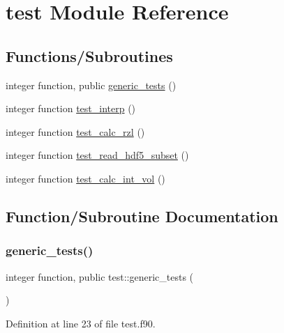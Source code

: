 \hypertarget{namespacetest}{}\section{test Module Reference}
\label{namespacetest}
\subsection*{Functions/\+Subroutines}
\begin{DoxyCompactItemize}
\item 
integer function, public \hyperlink{namespacetest_aca21ee464c0b1f4b617177afdde110ec}{generic\+\_\+tests} ()
\item 
integer function \hyperlink{namespacetest_af72aaa5773b5bef2ac8d25fd05378439}{test\+\_\+interp} ()
\item 
integer function \hyperlink{namespacetest_a4a25e64af6b986091f9e49ba447fc5c4}{test\+\_\+calc\+\_\+rzl} ()
\item 
integer function \hyperlink{namespacetest_ac574f08ba400cd61070a6a6f13f6f7ee}{test\+\_\+read\+\_\+hdf5\+\_\+subset} ()
\item 
integer function \hyperlink{namespacetest_a0d4cb791bf762b2e52260fea7644a3ee}{test\+\_\+calc\+\_\+int\+\_\+vol} ()
\end{DoxyCompactItemize}


\subsection{Function/\+Subroutine Documentation}
\mbox{\label{namespacetest_aca21ee464c0b1f4b617177afdde110ec}} 
\subsubsection{\texorpdfstring{generic\+\_\+tests()}{generic\_tests()}}
{\footnotesize\ttfamily integer function, public test\+::generic\+\_\+tests (\begin{DoxyParamCaption}{ }\end{DoxyParamCaption})}



Definition at line 23 of file test.\+f90.


